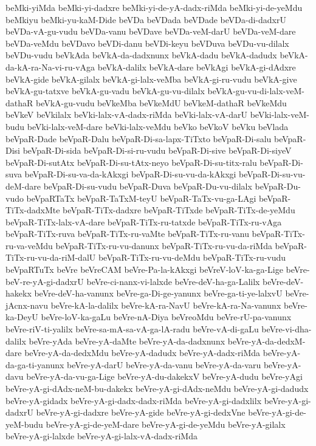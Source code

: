 {beMki-yiMda
beMki-yi-dadxre
beMki-yi-de-yA-dadx-riMda
beMki-yi-de-yeMdu
beMkiyu
beMki-yu-kaM-Dide
beVDa
beVDada
beVDade
beVDa-di-dadxrU
beVDa-vA-gu-vudu
beVDa-vanu
beVDave
beVDa-veM-darU
beVDa-veM-dare
beVDa-veMdu
beVDavo
beVDi-danu
beVDi-keyu
beVDuva
beVDu-vu-dilalx
beVDu-vudu
beVkAda
beVkA-da-dadxnunx
beVkA-dadu
beVkA-dadudx
beVkA-da-kA-ra-Na-vi-ru-vAga
beVkA-dalilx
beVkA-dare
beVkAgi
beVkA-gi-dAdxre
beVkA-gide
beVkA-gilalx
beVkA-gi-lalx-veMba
beVkA-gi-ru-vudu
beVkA-give
beVkA-gu-tatxve
beVkA-gu-vadu
beVkA-gu-vu-dilalx
beVkA-gu-vu-di-lalx-veM-dathaR
beVkA-gu-vudu
beVkeMba
beVkeMdU
beVkeM-dathaR
beVkeMdu
beVkeV
beVkilalx
beVki-lalx-vA-dadx-riMda
beVki-lalx-vA-darU
beVki-lalx-veM-budu
beVki-lalx-veM-dare
beVki-lalx-veMdu
beVko
beVkoV
beVku
beVlada
beVpaR-Dade
beVpaR-Dalu
beVpaR-Di-sa-lapx-TiTxto
beVpaR-Di-salu
beVpaR-Disi
beVpaR-Di-sida
beVpaR-Di-si-ru-vudu
beVpaR-Di-sive
beVpaR-Di-siyeV
beVpaR-Di-sutAtx
beVpaR-Di-su-tAtx-neyo
beVpaR-Di-su-titx-ralu
beVpaR-Di-suva
beVpaR-Di-su-va-da-kAkxgi
beVpaR-Di-su-vu-da-kAkxgi
beVpaR-Di-su-vu-deM-dare
beVpaR-Di-su-vudu
beVpaR-Duva
beVpaR-Du-vu-dilalx
beVpaR-Du-vudo
beVpaRTaTx
beVpaR-TaTxM-teyU
beVpaR-TaTx-vu-ga-LAgi
beVpaR-TiTx-dadxMte
beVpaR-TiTx-dadxre
beVpaR-TiTxde
beVpaR-TiTx-de-yeMdu
beVpaR-TiTx-lalx-vA-dare
beVpaR-TiTx-ru-tatxde
beVpaR-TiTx-ru-vAga
beVpaR-TiTx-ruva
beVpaR-TiTx-ru-vaMte
beVpaR-TiTx-ru-vanu
beVpaR-TiTx-ru-va-veMdu
beVpaR-TiTx-ru-vu-danunx
beVpaR-TiTx-ru-vu-da-riMda
beVpaR-TiTx-ru-vu-da-riM-dalU
beVpaR-TiTx-ru-vu-deMdu
beVpaR-TiTx-ru-vudu
beVpaRTuTx
beVre
beVreCAM
beVre-Pa-la-kAkxgi
beVreV-loV-ka-ga-Lige
beVre-beV-re-yA-gi-dadxrU
beVre-ci-nanx-vi-lalxde
beVre-deV-ha-ga-Lalilx
beVre-deV-hakekx
beVre-deV-ha-vanunx
beVre-ga-Di-ge-yanunx
beVre-ga-ti-ye-lalxvU
beVre-jAcnx-navu
beVre-kA-la-dalilx
beVre-kA-ra-NavU
beVre-kA-ra-Na-vanunx
beVre-ka-DeyU
beVre-loV-ka-gaLu
beVre-nA-Diya
beVreoMdu
beVre-rU-pa-vanunx
beVre-riV-ti-yalilx
beVre-sa-mA-sa-vA-ga-lA-radu
beVre-vA-di-gaLu
beVre-vi-dha-dalilx
beVre-yAda
beVre-yA-daMte
beVre-yA-da-dadxnunx
beVre-yA-da-dedxM-dare
beVre-yA-da-dedxMdu
beVre-yA-dadudx
beVre-yA-dadx-riMda
beVre-yA-da-ga-ti-yanunx
beVre-yA-darU
beVre-yA-da-vanu
beVre-yA-da-varu
beVre-yA-davu
beVre-yA-da-vu-ga-Lige
beVre-yA-du-dakekxV
beVre-yA-dudu
beVre-yAgi
beVre-yA-gi-dAdx-neM-bu-dakekx
beVre-yA-gi-dAdx-neMdu
beVre-yA-gi-dadudx
beVre-yA-gidadx
beVre-yA-gi-dadx-dadx-riMda
beVre-yA-gi-dadxlilx
beVre-yA-gi-dadxrU
beVre-yA-gi-dadxre
beVre-yA-gide
beVre-yA-gi-dedxVne
beVre-yA-gi-de-yeM-budu
beVre-yA-gi-de-yeM-dare
beVre-yA-gi-de-yeMdu
beVre-yA-gilalx
beVre-yA-gi-lalxde
beVre-yA-gi-lalx-vA-dadx-riMda
}
